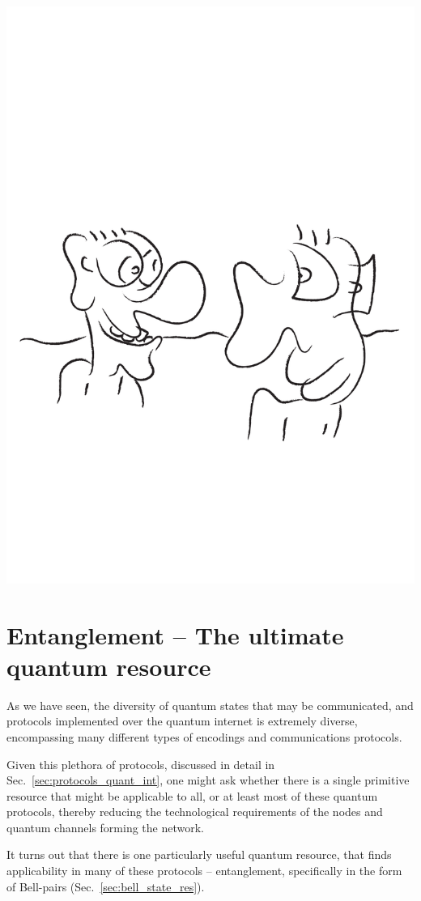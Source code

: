 \documentclass[aps, rmp, twocolumn, amsmath, amssymb, nofootinbib, superscriptaddress, longbibliography, floatfix, table-of-contents, eqsecnum]{revtex4-1}
\begin{document}
\begin{center}
	\includegraphics[width=0.6\columnwidth]{sketch_28}
\end{center}

%
%

\section{Entanglement -- The ultimate quantum resource} \label{sec:ent_ultimate} 

As we have seen, the diversity of quantum states that may be communicated, and protocols implemented over the quantum internet is extremely diverse, encompassing many different types of encodings and communications protocols.

Given this plethora of protocols, discussed in detail in Sec.~\ref{sec:protocols_quant_int}, one might ask whether there is a single primitive resource that might be applicable to all, or at least most of these quantum protocols, thereby reducing the technological requirements of the nodes and quantum channels forming the network.

It turns out that there is one particularly useful quantum resource, that finds applicability in many of these protocols -- entanglement, specifically in the form of Bell-pairs (Sec.~\ref{sec:bell_state_res}).
\end{document}
